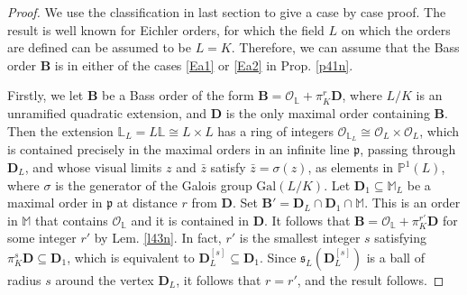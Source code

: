 \documentclass{amsart}
\theoremstyle{definition}
\newcommand\lu{\mathbb{L}}
\newcommand\alge{\mathbb{M}}
\newcommand\oink{\mathcal O}
\newcommand\Ba{\mathbf B}
\newcommand\Da{\mathbf{D}}
\begin{document}
\begin{proof}
We use the classification in last section 
to give a case
by case proof.  The result is well known for 
Eichler orders, for which the field $L$ 
on which the orders
are defined can be assumed to be $L=K$. Therefore,
we can assume that the Bass order $\Ba$ is 
in either of the cases \ref{Ea1} or 
\ref{Ea2} in Prop. \ref{p41n}.

Firstly, we let $\Ba$ be a Bass order of the form
$\Ba=\mathcal{O}_{\lu}+\pi_K^r\Da$,
where $L/K$ is an unramified quadratic extension,
and $\Da$ is the only maximal order containing
$\Ba$. Then the extension 
$\lu_L=L\lu\cong L\times L$
has a ring of integers 
$\oink_{\lu_L}\cong\oink_L\times\oink_L$,
which is contained precisely in the maximal orders 
in an infinite line $\mathfrak{p}$, passing through $\Da_L$, 
and whose visual limits $z$ and $\bar{z}$
satisfy $\bar{z}=\sigma(z)$,
as elements in $\mathbb{P}^1(L)$,
where $\sigma$ is the 
generator of the Galois group $\mathrm{Gal}(L/K)$.  
Let $\Da_1\subseteq\alge_L$ be a 
maximal order in $\mathfrak{p}$ at distance $r$ from $\Da$. Set 
$\Ba'=\Da_L\cap\Da_1\cap\alge $. 
This is an order in
$\alge $ that contains $\oink_{\lu}$ and 
it is contained
in $\Da$. It follows that 
$\Ba=\mathcal{O}_{\lu}+\pi_K^{r'}\Da$ for 
some integer
$r'$ by Lem. \ref{l43n}. In fact, $r'$ is the smallest integer $s$ satisfying
$\pi_K^s\Da\subseteq\Da_1$, which is equivalent
to $\Da_L^{[s]}\subseteq\Da_1$. Since 
$\mathfrak{s}_L\left(\Da_L^{[s]}\right)$ is a ball of radius $s$
around the vertex $\Da_L$, it follows that $r=r'$, 
and the result follows.


\end{proof}
\end{document}
